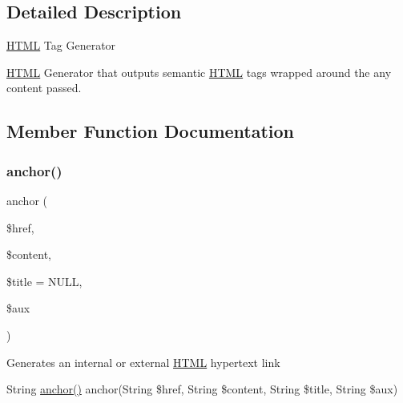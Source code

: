 \subsection{Detailed Description}
\hyperlink{class_w_a_f_f_l_e_1_1_framework_1_1_engines_1_1_h_t_m_l}{H\+T\+ML} Tag Generator

\hyperlink{class_w_a_f_f_l_e_1_1_framework_1_1_engines_1_1_h_t_m_l}{H\+T\+ML} Generator that outputs semantic \hyperlink{class_w_a_f_f_l_e_1_1_framework_1_1_engines_1_1_h_t_m_l}{H\+T\+ML} tags wrapped around the any content passed. 

\subsection{Member Function Documentation}
\mbox{\label{class_w_a_f_f_l_e_1_1_framework_1_1_engines_1_1_h_t_m_l_a3c534563b3b17abd31c70ce81c518a6d}} 
\subsubsection{\texorpdfstring{anchor()}{anchor()}}
{\footnotesize\ttfamily anchor (\begin{DoxyParamCaption}\item[{}]{\$href,  }\item[{}]{\$content,  }\item[{}]{\$title = {\ttfamily NULL},  }\item[{}]{\$aux }\end{DoxyParamCaption})}

Generates an internal or external \hyperlink{class_w_a_f_f_l_e_1_1_framework_1_1_engines_1_1_h_t_m_l}{H\+T\+ML} hypertext link

String \hyperlink{class_w_a_f_f_l_e_1_1_framework_1_1_engines_1_1_h_t_m_l_a3c534563b3b17abd31c70ce81c518a6d}{anchor()} anchor(String \$href, String \$content, String \$title, String \$aux)



